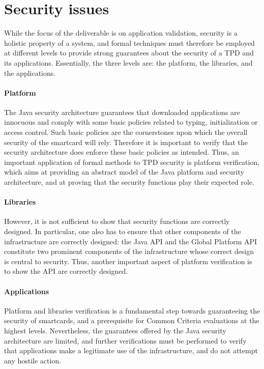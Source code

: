 \section{Security issues}
While the focus of the deliverable is on application validation,
security is a holistic property of a system, and formal techniques
must therefore be employed at different levels to provide strong
guarantees about the security of a TPD and its applications.
Essentially, the three levels are: the platform, the libraries,
and the applications.

\paragraph*{Platform} The Java security architecture guarantees that
downloaded applications are innocuous and comply with some basic
policies related to typing, initialization or access control. Such
basic policies are the cornerstones upon which the overall security of
the smartcard will rely. Therefore it is important to verify that the
security architecture does enforce these basic policies as
intended. Thus, an important application of formal methods to TPD
security is platform verification, which aims at providing an abstract
model of the Java platform and security architecture, and at proving
that the security functions play their expected role.

\paragraph*{Libraries} However, it is not
sufficient to show that security functions are correctly designed. In
particular, one also has to ensure that other components of the
infrastructure are correctly designed: the Java API and the Global
Platform API constitute two prominent components of the infrastructure
whose correct design is central to security. Thus, another important
aspect of platform verification is to show the API are correctly
designed.

\paragraph*{Applications} 
Platform and libraries verification is a fundamental step towards
guaranteeing the security of smartcards, and a prerequisite for Common
Criteria evaluations at the highest levels. Nevertheless, the
guarantees offered by the Java security architecture are limited, and
further verifications must be performed to verify that applications
make a legitimate use of the infrastructure, and do not attempt any
hostile action.

